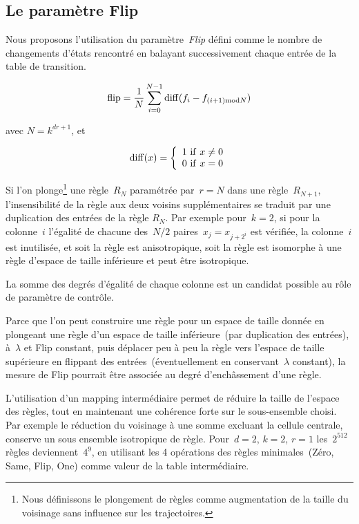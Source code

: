 \subsection*{Le param\`etre Flip}

Nous proposons l'utilisation du param\`etre~\emph{Flip} d\'efini comme le
nombre de changements d'\'etats rencontr\'e en balayant successivement
chaque entr\'ee de la table de transition.

\[{\rm flip} =
\frac{1}{N}\sum_{i=0}^{N-1}{\rm diff}(f_{i}-f_{(i+1){\rm mod}N})\]

avec $N=k^{dr+1}$, et

\[{\rm diff}(x) = \left\lbrace
\begin{array}{l}
  1\ {\rm if}\ x \ne 0\\ 0\ {\rm if}\ x = 0
\end{array}
\right.\]

Si l'on plonge\footnote{%
  Nous d\'efinissons le plongement de r\`egles comme augmentation de la
  taille du voisinage sans influence sur les trajectoires.} %
une r\`egle~$R_{N}$ param\'etr\'ee par~$r = N$ dans une
r\`egle~$R_{N + 1}$, l'insensibilit\'e de la r\`egle aux deux voisins
suppl\'ementaires se traduit par une duplication des entr\'ees de la r\`egle
$R_{N}$. %
Par exemple pour~$k = 2$, si pour la colonne~$i$ l'\'egalit\'e de chacune
des~$N/2$ paires~$x_{j} = x_{j + 2^{i}}$ est v\'erifi\'ee, la colonne~$i$
est inutilis\'ee, et soit la r\`egle est anisotropique, soit la r\`egle est
isomorphe \`a une r\`egle d'espace de taille inf\'erieure et peut \^etre
isotropique.

La somme des degr\'es d'\'egalit\'e de chaque colonne est un candidat
possible au r\^ole de param\`etre de contr\^ole.

Parce que l'on peut construire une r\`egle pour un espace de taille
donn\'ee en plongeant une r\`egle d'un espace de taille inf\'erieure~(par
duplication des entr\'ees), \`a~$\lambda$ et Flip constant, puis d\'eplacer
peu \`a peu la r\`egle vers l'espace de taille sup\'erieure en flippant des
entr\'ees~(\'eventuellement en conservant~$\lambda$ constant), la mesure
de Flip pourrait \^etre associ\'ee au degr\'e d'ench\^assement d'une r\`egle.

L'utilisation d'un mapping interm\'ediaire permet de r\'eduire la taille
de l'espace des r\`egles, tout en maintenant une coh\'erence forte sur le
sous-ensemble choisi. %
Par exemple le r\'eduction du voisinage \`a une somme excluant la cellule
centrale, conserve un sous ensemble isotropique de r\`egle. %
Pour~$d = 2$, $k = 2$, $r = 1$ les~$2^{512}$ r\`egles
deviennent~$4^{9}$, en utilisant les 4 op\'erations des r\`egles
minimales~(Z\'ero, Same, Flip, One) comme valeur de la table
interm\'ediaire. %


